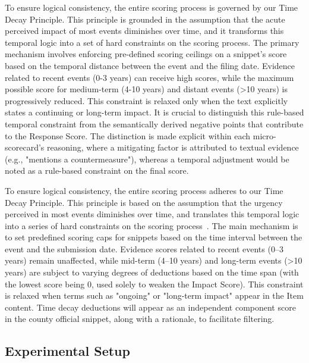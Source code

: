 \documentclass[sigconf]{acmart}
\begin{document}
To ensure logical consistency, the entire scoring process is governed by our Time Decay Principle. This principle is grounded in the assumption that the acute perceived impact of most events diminishes over time, and it transforms this temporal logic into a set of hard constraints on the scoring process. The primary mechanism involves enforcing pre-defined scoring ceilings on a snippet's score based on the temporal distance between the event and the filing date. Evidence related to recent events (0-3 years) can receive high scores, while the maximum possible score for medium-term (4-10 years) and distant events (>10 years) is progressively reduced. This constraint is relaxed only when the text explicitly states a continuing or long-term impact. It is crucial to distinguish this rule-based temporal constraint from the semantically derived negative points that contribute to the Response Score. The distinction is made explicit within each micro-scorecard's reasoning, where a mitigating factor is attributed to textual evidence (e.g., "mentions a countermeasure"), whereas a temporal adjustment would be noted as a rule-based constraint on the final score.

To ensure logical consistency, the entire scoring process adheres to our Time Decay Principle. This principle is based on the assumption that the urgency perceived in most events diminishes over time, and translates this temporal logic into a series of hard constraints on the scoring process~\cite{chen2003life}. The main mechanism is to set predefined scoring caps for snippets based on the time interval between the event and the submission date. Evidence scores related to recent events (0–3 years) remain unaffected, while mid-term (4–10 years) and long-term events (>10 years) are subject to varying degrees of deductions based on the time span (with the lowest score being 0, used solely to weaken the Impact Score). This constraint is relaxed when terms such as "ongoing" or "long-term impact" appear in the Item content. Time decay deductions will appear as an independent component score in the county official snippet, along with a rationale, to facilitate filtering.

\subsection{Experimental Setup} 
\end{document}
